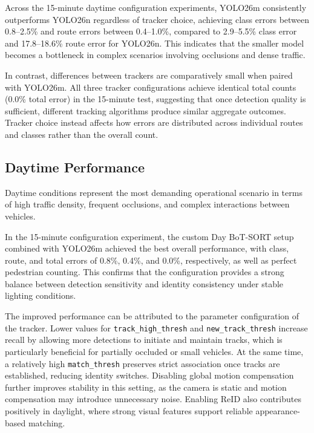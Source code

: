 Across the 15-minute daytime configuration experiments, YOLO26m consistently outperforms YOLO26n regardless of tracker choice, achieving class errors between 0.8--2.5\% and route errors between 0.4--1.0\%, compared to 2.9--5.5\% class error and 17.8--18.6\% route error for YOLO26n. This indicates that the smaller model becomes a bottleneck in complex scenarios involving occlusions and dense traffic. 

In contrast, differences between trackers are comparatively small when paired with YOLO26m. All three tracker configurations achieve identical total counts (0.0\% total error) in the 15-minute test, suggesting that once detection quality is sufficient, different tracking algorithms produce similar aggregate outcomes. Tracker choice instead affects how errors are distributed across individual routes and classes rather than the overall count.

\subsection{Daytime Performance}

Daytime conditions represent the most demanding operational scenario in terms of high traffic density, frequent occlusions, and complex interactions between vehicles. 

In the 15-minute configuration experiment, the custom Day BoT-SORT setup combined with YOLO26m achieved the best overall performance, with class, route, and total errors of 0.8\%, 0.4\%, and 0.0\%, respectively, as well as perfect pedestrian counting. This confirms that the configuration provides a strong balance between detection sensitivity and identity consistency under stable lighting conditions.

The improved performance can be attributed to the parameter configuration of the tracker. Lower values for \texttt{track\_high\_thresh} and \texttt{new\_track\_thresh} increase recall by allowing more detections to initiate and maintain tracks, which is particularly beneficial for partially occluded or small vehicles. At the same time, a relatively high \texttt{match\_thresh} preserves strict association once tracks are established, reducing identity switches. Disabling global motion compensation further improves stability in this setting, as the camera is static and motion compensation may introduce unnecessary noise. Enabling ReID also contributes positively in daylight, where strong visual features support reliable appearance-based matching.

